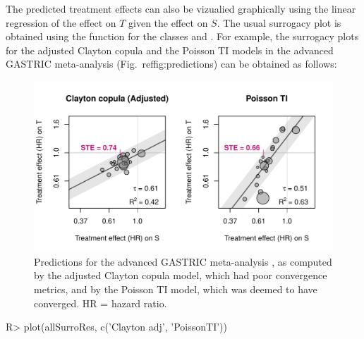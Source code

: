 \documentclass[article,shortnames, nojss]{jss}\usepackage[]{graphicx}\usepackage[]{color}
\begin{document}
The predicted treatment effects can also be vizualied graphically
  using the linear regression of the effect on $T$ given the effect on $S$.
The usual surrogacy plot is obtained using the function 
  for the classes  and .
For example, the surrogacy plots
  for the adjusted Clayton copula and the Poisson TI models
  in the advanced GASTRIC meta-analysis (Fig.~ref{fig:predictions})
  can be obtained as follows:
\begin{Schunk}
\begin{figure}
\includegraphics[width=\textwidth]{figure/predictions-1} \caption[Predictions for the advanced GASTRIC meta-analysis \citep{GASTRIC13}, as computed by the adjusted Clayton copula model, which had poor convergence metrics, and by the Poisson TI model, which was deemed to have converged]{Predictions for the advanced GASTRIC meta-analysis \citep{GASTRIC13}, as computed by the adjusted Clayton copula model, which had poor convergence metrics, and by the Poisson TI model, which was deemed to have converged. HR = hazard ratio.}\label{fig:predictions}
\end{figure}
\end{Schunk}
\begin{Schunk}
\begin{Sinput}
R>   plot(allSurroRes, c('Clayton adj', 'PoissonTI'))
\end{Sinput}
\end{Schunk}
\end{document}
